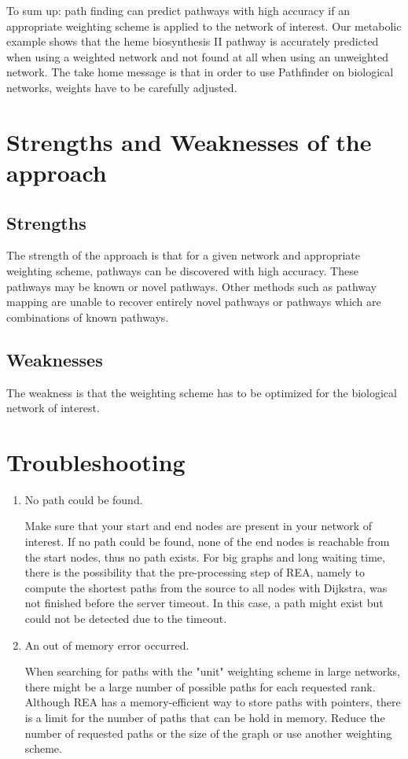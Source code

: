 To sum up: path finding can predict pathways with high accuracy if an appropriate weighting scheme is applied to the network of interest. Our metabolic example shows that the heme biosynthesis II pathway is accurately predicted when using a weighted network and not found at all when using an unweighted network. The take home message is that in order to use Pathfinder on biological networks, weights have to be carefully adjusted.

\section{Strengths and Weaknesses of the approach}

\subsection{Strengths}
The strength of the approach is that for a given network and appropriate weighting scheme, pathways can be discovered with high accuracy. These pathways may be known or novel pathways. Other methods such as pathway mapping
are unable to recover entirely novel pathways or pathways which are combinations of known pathways.

\subsection{Weaknesses}
The weakness is that the weighting scheme has to be optimized for the biological network of interest.

\section{Troubleshooting}

\begin{enumerate}

\item No path could be found.

 Make sure that your start and end nodes are present in your network of interest. If no path could be found, none
 of the end nodes is reachable from the start nodes, thus no path exists. For big graphs and long waiting time, there is the possibility that
 the pre-processing step of REA, namely to compute the shortest paths from the source to all nodes with Dijkstra, was not finished before
 the server timeout. In this case, a path might exist but could not be detected due to the timeout.

\item An out of memory error occurred.

 When searching for paths with the "unit" weighting scheme in large networks, there might be
 a large number of possible paths for each requested rank.  Although REA has a memory-efficient
 way to store paths with pointers, there is a limit for the number of paths that can be hold in memory.
 Reduce the number of requested paths or the size of the graph or use another weighting scheme.

\end{enumerate}







